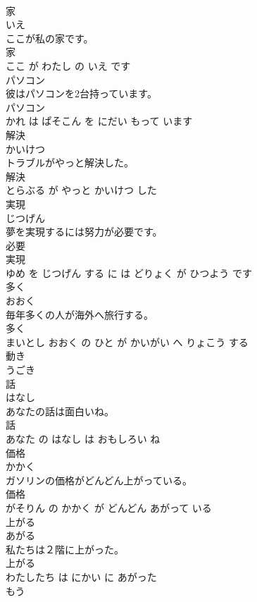 \documentclass[8pt]{extreport}
\begin{document}
\begin{CJK}{UTF8}{min}
\\	家	
\\	いえ			
\\	ここが私の家です。	
\\	家 
\\	ここ が わたし の いえ です			
\\	パソコン	
\\	彼はパソコンを2台持っています。	
\\	パソコン 
\\	かれ は ぱそこん を にだい もって います			
\\	解決	
\\	かいけつ			
\\	トラブルがやっと解決した。	
\\	解決 
\\	とらぶる が やっと かいけつ した			
\\	実現	
\\	じつげん			
\\	夢を実現するには努力が必要です。	
\\	必要 
\\	実現 
\\	ゆめ を じつげん する に は どりょく が ひつよう です			
\\	多く	
\\	おおく			
\\	毎年多くの人が海外へ旅行する。	
\\	多く 
\\	まいとし おおく の ひと が かいがい へ りょこう する			
\\	動き	
\\	うごき			
\\	話	
\\	はなし			
\\	あなたの話は面白いね。	
\\	話 
\\	あなた の はなし は おもしろい ね			
\\	価格	
\\	かかく			
\\	ガソリンの価格がどんどん上がっている。	
\\	価格 
\\	がそりん の かかく が どんどん あがって いる			
\\	上がる	
\\	あがる			
\\	私たちは２階に上がった。	
\\	上がる 
\\	わたしたち は にかい に あがった			
\\	もう	

\end{CJK}
\end{document}
